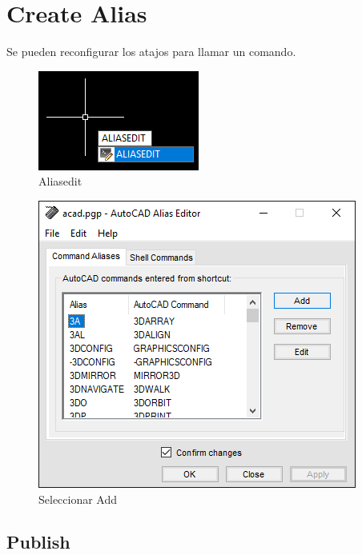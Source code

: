 \documentclass[12pt,letterpaper,final]{report}
\begin{document}
\chapter{Create Alias}

Se pueden reconfigurar los atajos para llamar un comando.

\begin{figure}[H]
	\centering
	\includegraphics[width=0.65\linewidth, height=0.5\textheight,keepaspectratio]{Imagenes/autocad_alias_01}
	\caption{Aliasedit}
	\label{fig:autocadalias01}
\end{figure}

\begin{figure}[H]
	\centering
	\includegraphics[width=0.75\linewidth, height=0.5\textheight,keepaspectratio]{Imagenes/autocad_alias_02}
	\caption{Seleccionar Add}
	\label{fig:autocadalias02}
\end{figure}


\section{Publish}
\end{document}
